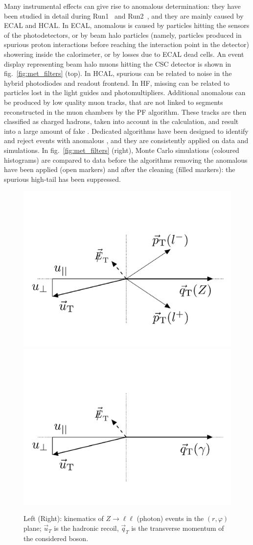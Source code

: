 \noindent Many instrumental effects can give rise to anomalous \MET determination: they have been studied in detail during Run1~\cite{Chatrchyan:2011tn,CMS:vgm} and Run2~\cite{CMS:2016ljj}, and they are mainly caused by ECAL and HCAL. In ECAL, anomalous \met is caused by particles hitting the sensors of the photodetectors, or by beam halo particles (namely, particles produced in spurious proton interactions before reaching the interaction point in the detector) showering inside the calorimeter, or by losses due to ECAL dead cells. An event display representing beam halo muons hitting the CSC detector is shown in fig.~\ref{fig:met_filters} (top). In HCAL, spurious \met can be related to noise in the hybrid photodiodes and readout frontend. In HF, missing \pt can be related to particles lost in the light guides and photomultipliers. Additional anomalous \MET can be produced by low quality muon tracks, that are not linked to segments reconstructed in the muon chambers by the PF algorithm. These tracks are then classified as charged hadrons, taken into account in the \met calculation, and result into a large amount of fake \MET. Dedicated algorithms have been designed to identify and reject events with anomalous \MET, and they are consistently applied on data and simulations. In fig.~\ref{fig:met_filters} (right), Monte Carlo simulations (coloured histograms) are compared to data before the algorithms removing the anomalous \MET have been applied (open markers) and after the cleaning (filled markers): the spurious high-\met tail has been suppressed.

\begin{figure}[!htb]
  \centering
    \includegraphics[width=.35\textwidth]{figures/MetPlots/u_comp_Z.png}%
    \includegraphics[width=.35\textwidth]{figures/MetPlots/u_comp_gamma.png}

  \caption{Left (Right): kinematics of $Z \rightarrow \ell \ell$ (photon) events in the $(r, \varphi)$ plane; $\vec{u}_T$ is the hadronic recoil, $\vec{q}_T$ is the transverse momentum of the considered boson.}
  \label{fig:recoil}
\end{figure}

